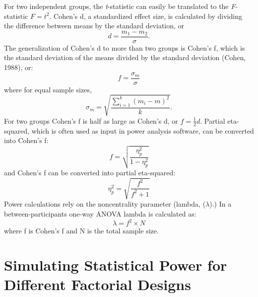 \documentclass[
  ,man,floatsintext]{apa6}
\begin{document}
\begin{tcolorbox}[colback=black!5!white,colframe=white!5!black,title=Box 1. Formula for effect sizes for ANOVA designs]
For two independent groups, the \textit{t}-statistic can easily be translated to the \textit{F}-statistic $F = t^2$.
Cohen's d, a standardized effect size, is calculated by dividing the difference between means by the standard deviation, or 
\begin{equation}
d = \frac{m_1-m_2}{\sigma}.
\end{equation}
The generalization of Cohen's d to more than two groups is Cohen's f, which is the standard deviation of the means divided by the standard deviation (Cohen, 1988), or: 
\begin{equation}
f = \frac{\sigma _{ m }}{\sigma}
\end{equation}
where for equal sample sizes,
\begin{equation}
\sigma _{ m } = \sqrt { \frac { \sum_ { i = 1 } ^ { k } ( m _ { i } - m ) ^ { 2 } } { k } }.
\end{equation}
For two groups Cohen's f is half as large as Cohen's d, or $f = \frac{1}{2}d$.
Partial eta-squared, which is often used as input in power analysis software, can be converted into Cohen's f:
\begin{equation}
f = \sqrt{\frac{\eta_p^2}{1-\eta_p^2}} \label{eq:eta-to-f}
\end{equation}
and Cohen's f can be converted into partial eta-squared:
\begin{equation}
\eta_p^2 = \sqrt{\frac{f^2}{f^2+1}} \label{eq:f-to-eta}
\end{equation}
Power calculations rely on the noncentrality parameter (lambda, ($\lambda$).) 
In a between-participants one-way ANOVA lambda is calculated as:
\begin{equation}
\lambda = f^2 \times N \label{eq:lambda}
\end{equation}
where f is Cohen's f and N is the total sample size. 
\end{tcolorbox}

\hypertarget{simulating-statistical-power-for-different-factorial-designs}{%
\section{Simulating Statistical Power for Different Factorial Designs}\label{simulating-statistical-power-for-different-factorial-designs}}
\end{document}
